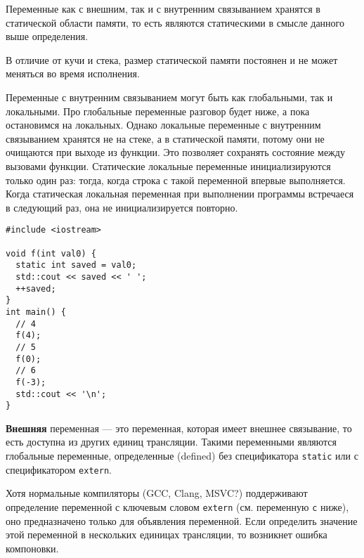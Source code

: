 Переменные как с внешним, так и с внутренним связыванием хранятся в статической области
памяти, то есть являются статическими в смысле данного выше определения.

В отличие от кучи и стека, размер статической памяти постоянен и не может меняться во время
исполнения.

Переменные с внутренним связыванием могут быть как глобальными, так и локальными.
Про глобальные переменные разговор будет ниже, а пока остановимся на локальных.
Однако локальные переменные с внутренним связыванием хранятся не на стеке, а в статической
памяти, потому они не очищаются при выходе из функции. Это позволяет сохранять состояние
между вызовами функции. Статические локальные переменные инициализируются только один раз:
тогда, когда строка с такой переменной впервые выполняется. Когда статическая локальная переменная
при выполнении программы встречаеся в следующий раз, она не инициализируется повторно.

\begin{verbatim}
#include <iostream>

void f(int val0) {
  static int saved = val0;
  std::cout << saved << ' ';
  ++saved;
}
int main() {
  // 4
  f(4);
  // 5
  f(0);
  // 6
  f(-3);
  std::cout << '\n';
}
\end{verbatim}

\textbf{Внешняя} переменная --- это переменная, которая имеет внешнее связывание,
то есть доступна из других единиц трансляции. Такими переменными
являются глобальные переменные, определенные (defined) без спецификатора \verb|static| или с
спецификатором \verb|extern|.

Хотя нормальные компиляторы (GCC, Clang, MSVC?) поддерживают определение переменной с ключевым словом
\verb|extern| (см. переменную \verb|c| ниже), оно предназначено только для объявления переменной. Если определить
значение этой переменной в нескольких единицах трансляции, то возникнет ошибка компоновки.

